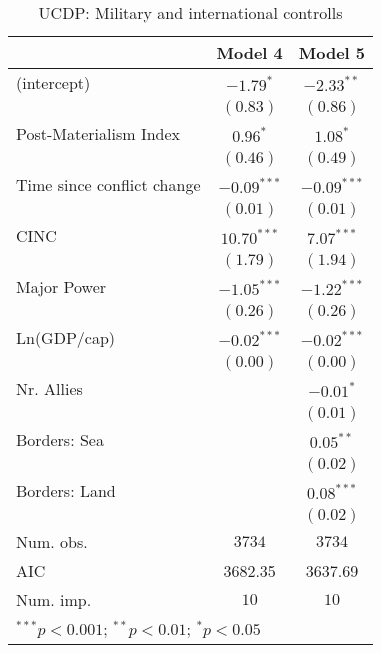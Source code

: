 
\begin{table}
\begin{center}
\begin{tabular}{l c c}
\toprule
 & Model 4 & Model 5 \\
\midrule
(intercept)                & $-1.79^{*}$   & $-2.33^{**}$  \\
                           & $(0.83)$      & $(0.86)$      \\
Post-Materialism Index     & $0.96^{*}$    & $1.08^{*}$    \\
                           & $(0.46)$      & $(0.49)$      \\
Time since conflict change & $-0.09^{***}$ & $-0.09^{***}$ \\
                           & $(0.01)$      & $(0.01)$      \\
CINC                       & $10.70^{***}$ & $7.07^{***}$  \\
                           & $(1.79)$      & $(1.94)$      \\
Major Power                & $-1.05^{***}$ & $-1.22^{***}$ \\
                           & $(0.26)$      & $(0.26)$      \\
Ln(GDP/cap)                & $-0.02^{***}$ & $-0.02^{***}$ \\
                           & $(0.00)$      & $(0.00)$      \\
Nr. Allies                 &               & $-0.01^{*}$   \\
                           &               & $(0.01)$      \\
Borders: Sea               &               & $0.05^{**}$   \\
                           &               & $(0.02)$      \\
Borders: Land              &               & $0.08^{***}$  \\
                           &               & $(0.02)$      \\
\midrule
Num. obs.                  & $3734$        & $3734$        \\
AIC                        & 3682.35       & 3637.69       \\
Num. imp.                  & $10$          & $10$          \\
\bottomrule
\multicolumn{3}{l}{\scriptsize{$^{***}p<0.001$; $^{**}p<0.01$; $^{*}p<0.05$}}
\end{tabular}
\caption{UCDP: Military and international controlls}
\label{UCDP_2_PM}
\end{center}
\end{table}
